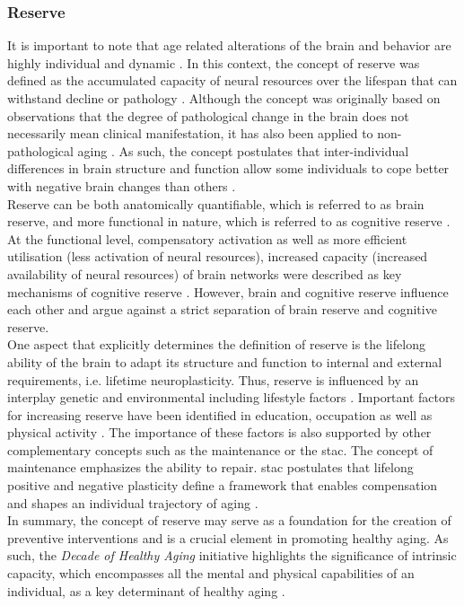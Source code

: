 \subsubsection{Reserve}
\label{theory:aging:reserve}
It is important to note that age related alterations of the brain and behavior are highly individual and dynamic \cite{Smith2020,Koen2019,Douw2014}. In this context, the concept of reserve was defined as the accumulated capacity of neural resources over the lifespan that can withstand decline or pathology \cite{Cabeza2018, Stern2009}. Although the concept was originally based on observations that the degree of pathological change in the brain does not necessarily mean clinical manifestation, it has also been applied to non-pathological aging \cite{Esiri2001,Cabeza2018,Stern2009}. As such, the concept postulates that inter-individual differences in brain structure and function allow some individuals to cope better with negative brain changes than others \cite{Stern2009}.\\
Reserve can be both anatomically quantifiable, which is referred to as brain reserve, and more functional in nature, which is referred to as cognitive reserve \cite{Stern2009}. At the functional level, compensatory activation as well as more efficient utilisation (less activation of neural resources), increased capacity (increased availability of neural resources) of brain networks were described as key mechanisms of cognitive reserve \cite{Stern2004,Stern2009}. However, brain and cognitive reserve influence each other and \citeauthor{Cabeza2018} \cite{Cabeza2018} argue against a strict separation of brain reserve and cognitive reserve.\\
One aspect that explicitly determines the definition of reserve is the lifelong ability of the brain to adapt its structure and function to internal and external requirements, i.e. lifetime neuroplasticity. Thus, reserve is influenced by an interplay genetic and environmental including lifestyle factors \cite{Cabeza2018}. Important factors for increasing reserve have been identified in education, occupation as well as physical activity \cite{Cabeza2018,Stern2009}. The importance of these factors is also supported by other complementary concepts such as the maintenance or the \gls{stac}. The concept of maintenance emphasizes the ability to repair. \Gls{stac} postulates that lifelong positive and negative plasticity define a framework that enables compensation and shapes an individual trajectory of aging \cite{Reuter-Lorenz2014}.\\
In summary, the concept of reserve may serve as a foundation for the creation of preventive interventions and is a crucial element in promoting healthy aging. As such, the \textit{Decade of Healthy Aging} initiative highlights the significance of intrinsic capacity, which encompasses all the mental and physical capabilities of an individual, as a key determinant of healthy aging \cite{who_decade_ha2020}.

